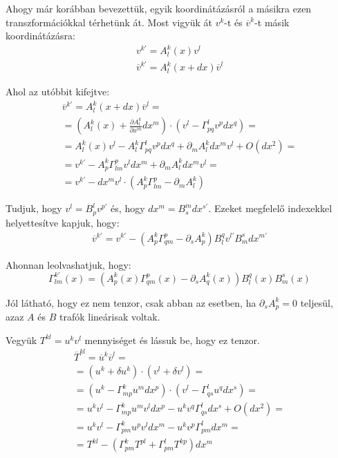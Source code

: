 \documentclass[a4paper,12pt]{article}
\begin{document}
\par Ahogy már korábban bevezettük, egyik koordinátázásról a másikra ezen transzformációkkal térhetünk át. Most vigyük át $v^{k}$-t és $\overline{v}^{k}$-t másik koordinátázásra:
\begin{gather*}
    v^{k\prime} = A^{k}_{l}(x)v^{l} \\
    \overline{v}^{k\prime} = A^{k}_{l}(x + dx)\overline{v}^{l}
\end{gather*}
\par Ahol az utóbbit kifejtve:
\begin{align*}
    \overline{v}^{k\prime} = A^{k}_{l}(x + dx)\overline{v}^{l} = \\
    = (A^{k}_{l}(x) + \frac{\partial A^{k}_{l}}{\partial x^{m}}dx^{m})\cdot(v^{l} - \Gamma_{pq}^{l}v^{p}dx^{q}) = \\
    = A^{k}_{l}(x)v^{l} - A^{k}_{l}\Gamma^{l}_{pq}v^{p}dx^{q} + \partial_{m}A^{k}_{l}dx^{m}v^{l} + O(dx^{2}) = \\
    = v^{k\prime} - A^{k}_{p}\Gamma_{lm}^{p}v^{l}dx^{m} + \partial_{m}A^{k}_{l}dx^{m}v^{l} = \\
    = v^{k\prime} - dx^{m}v^{l}\cdot( A^{k}_{p}\Gamma_{lm}^{p} - \partial_{m}A^{k}_{l} )
\end{align*}
\par Tudjuk, hogy $v^{l} = B^{l}_{p}v^{p\prime}$ és, hogy $dx^{m} = B_{s}^{m}dx^{s\prime}$. Ezeket megfelelő indexekkel helyettesítve kapjuk, hogy:
\begin{gather*}
    \overline{v}^{k\prime} = v^{k\prime} - ( A^{k}_{p}\Gamma_{qm}^{p} - \partial_{s} A^{k}_{p} )B^{q}_{l}v^{l\prime}B_{m}^{s}dx^{m\prime}
\end{gather*}
\par Ahonnan leolvashatjuk, hogy:
\begin{equation*}
    \Gamma_{lm}^{k\prime}(x) = ( A^{k}_{p}(x)\Gamma_{qm}^{p}(x) - \partial_{s}A_{q}^{k}(x) )B_{l}^{q}(x)B_{m}^{s}(x)    
\end{equation*}
\par Jól látható, hogy ez nem tenzor, csak abban az esetben, ha $\partial_{s}A^{k}_{p} = 0$ teljesül, azaz $A$ és $B$ trafók lineárisak voltak.
\par Vegyük $T^{kl} = u^{k}v^{l}$ mennyiséget és lássuk be, hogy ez tenzor.
\begin{align*}
    \overline{T}^{kl} = \overline{u}^{k}\overline{v}^{l} = \\
    = (u^{k} + \delta u^{k})\cdot(v^{l} + \delta v^{l}) = \\
    = (u^{k} - \Gamma_{mp}^{k}u^{m}dx^{p} )\cdot(v^{l} - \Gamma_{qs}^{l}u^{q}dx^{s}) = \\
    = u^{k}v^{l} - \Gamma_{mp}^{k}u^{m}v^{l}dx^{p} - u^{k}v^{q}\Gamma_{qs}^{l}dx^{s} + O(dx^{2}) = \\
    = u^{k}v^{l} - \Gamma_{pm}^{k}u^{p}v^{l}dx^{m} - u^{k}v^{p}\Gamma_{pm}^{l}dx^{m} = \\
    = T^{kl} - (\Gamma_{pm}^{k}T^{pl} + \Gamma_{pm}^{l}T^{kp})dx^{m}
\end{align*}
\end{document}
